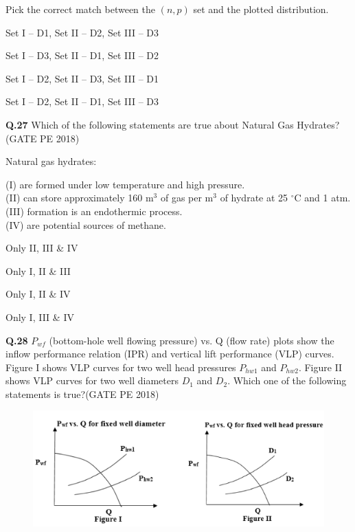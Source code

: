 \documentclass[15pt,a4paper]{article}
\begin{document}
Pick the correct match between the $(n, p)$ set and the plotted distribution.

\begin{enumerate}
\begin{multicols}{2}
\item Set I – D1, Set II – D2, Set III – D3 \item Set I – D3, Set II – D1, Set III – D2 
\item Set I – D2, Set II – D3, Set III – D1 \item Set I – D2, Set II – D1, Set III – D3
\end{multicols}
\end{enumerate}

\pagebreak

\noindent\textbf{Q.27} Which of the following statements are true about Natural Gas Hydrates?
\hfill (GATE PE 2018)

\vspace{0.2cm}
\noindent
Natural gas hydrates:


\noindent
(I) are formed under low temperature and high pressure.\\
(II) can store approximately 160 m$^3$ of gas per m$^3$ of hydrate at 25 $^\circ$C and 1 atm.\\
(III) formation is an endothermic process.\\
(IV) are potential sources of methane.


\begin{enumerate} 
\begin{multicols}{2}

\item Only II, III \& IV \item Only I, II \& III
\item Only I, II \& IV  \item Only I, III \& IV 
\end{multicols}
\end{enumerate}

\noindent
\textbf{Q.28} $P_{wf}$ (bottom-hole well flowing pressure) vs. Q (flow rate) plots show the inflow
performance relation (IPR) and vertical lift performance (VLP) curves. Figure I shows
VLP curves for two well head pressures $P_{hw1}$ and $P_{hw2}$. Figure II shows VLP curves for two
well diameters $D_1$ and $D_2$. Which one of the following statements is true?\hfill(GATE PE 2018)

\begin{figure}[h!]
  \centering
  \includegraphics[width=0.8\columnwidth]{pic9.png} 
\end{figure}
\end{document}
